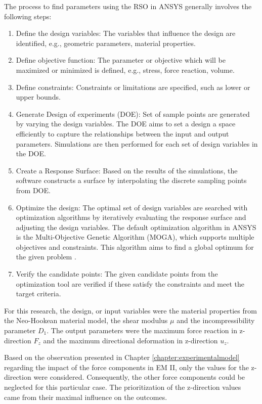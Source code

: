 The process to find parameters using the RSO in ANSYS generally involves the following steps:
\begin{enumerate}
    \item Define the design variables: The variables that influence the design are identified, e.g., geometric parameters, material properties.
    \item Define objective function: The parameter or objective which will be maximized or minimized is defined, e.g., stress, force reaction, volume. 
    \item Define constraints: Constraints or limitations are specified, such as lower or upper bounds.
    \item Generate Design of experiments (DOE): Set of sample points are generated by varying the design variables. The DOE aims to set a design a space efficiently to capture the relationships between the input and output parameters. Simulations are then performed for each set of design variables in the DOE.  
    \item Create a Response Surface: Based on the results of the simulations, the software constructs a surface by interpolating the discrete sampling points from DOE.
    \item Optimize the design: The optimal set of design variables are searched with optimization algorithms by iteratively evaluating the response surface and adjusting the design variables. The default optimization algorithm in ANSYS is the Multi-Objective Genetic Algorithm (MOGA), which supports multiple objectives and constraints. This algorithm aims to find a global optimum for the given problem \cite{Grebenisan2017}.
    \item Verify the candidate points: The given candidate points from the optimization tool are verified if these satisfy the constraints and meet the target criteria.
\end{enumerate}

For this research, the design, or input variables were the material properties from the Neo-Hookean 
material model, the shear modulus $\mu$ and the incompressibility parameter $D_1$. The output parameters 
were the maximum force reaction in z-direction $F_z$ and the maximum directional deformation in z-direction $u_z$.

Based on the observation presented in Chapter \ref{chapter:experimentalmodel} regarding the impact of the force 
components in EM II, only the values for the z-direction were considered. Consequently, the other force 
components could be neglected for this particular case. The prioritization of the z-direction values came from 
their maximal influence on the outcomes.

